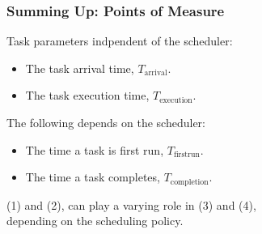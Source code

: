 \begin{frame}

\frametitle{Summing Up: Points of Measure}

\vspace{\fill}

Task parameters indpendent of the scheduler:

\begin{itemize}

\item[1.] The task arrival time, $T_{\text{arrival}}$.

\item[2.] The task execution time, $T_{\text{execution}}$.

\end{itemize}

The following depends on the scheduler:

\begin{itemize}

\item[3.] The time a task is first run, $T_{\text{firstrun}}$.

\item[4.] The time a task completes, $T_{\text{completion}}$.

\end{itemize}

\vspace{\fill}

\begin{center}

(1) and (2), can play a varying role in (3) and (4), \\ depending on the
scheduling policy.

\end{center}





\end{frame}
